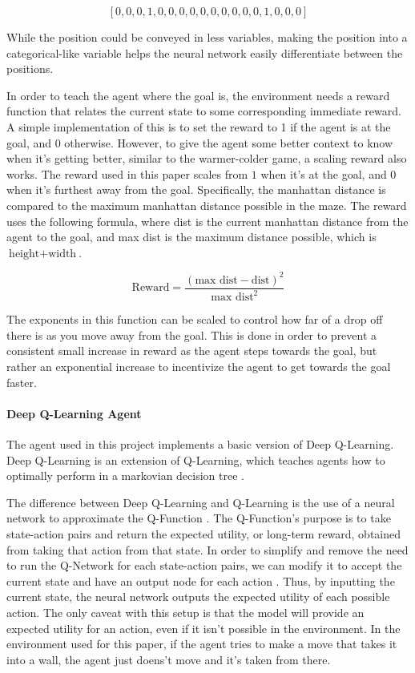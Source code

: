 \documentclass[12pt,letterpaper]{article}
\begin{document}
$$\left[0,0,0,1,0,0,0,0,0,0,0,0,0,0,1,0,0,0\right]$$

While the position could be conveyed in less variables, making the position into a categorical-like variable helps the neural network easily differentiate between the positions.

In order to teach the agent where the goal is, the environment needs a reward function that relates the current state to some corresponding immediate reward.
A simple implementation of this is to set the reward to 1 if the agent is at the goal, and 0 otherwise.
However, to give the agent some better context to know when it's getting better, similar to the warmer-colder game, a scaling reward also works.
The reward used in this paper scales from $1$ when it's at the goal, and $0$ when it's furthest away from the goal.
Specifically, the manhattan distance is compared to the maximum manhattan distance possible in the maze.
The reward uses the following formula, where dist is the current manhattan distance from the agent to the goal, and max dist is the maximum distance possible, which is $\text{height} + \text{width}$.

$$\text{Reward} = \frac{(\text{max dist} - \text{dist}) ^ 2}{\text{max dist}^2}$$

The exponents in this function can be scaled to control how far of a drop off there is as you move away from the goal.
This is done in order to prevent a consistent small increase in reward as the agent steps towards the goal, but rather an exponential increase to incentivize the agent to get towards the goal faster.

\paragraph{Deep Q-Learning Agent}

The agent used in this project implements a basic version of Deep Q-Learning.
Deep Q-Learning is an extension of Q-Learning, which teaches agents how to optimally perform in a markovian decision tree \cite{article_q_learning}.

The difference between Deep Q-Learning and Q-Learning is the use of a neural network to approximate the Q-Function \cite{article_human_level_control_deep_reinforcement_learning}.
The Q-Function's purpose is to take state-action pairs and return the expected utility, or long-term reward, obtained from taking that action from that state.
In order to simplify and remove the need to run the Q-Network for each state-action pairs, we can modify it to accept the current state and have an output node for each action \cite{article_reinforcement_learning_survey}.
Thus, by inputting the current state, the neural network outputs the expected utility of each possible action.
The only caveat with this setup is that the model will provide an expected utility for an action, even if it isn't possible in the environment.
In the environment used for this paper, if the agent tries to make a move that takes it into a wall, the agent just doens't move and it's taken from there.
\end{document}
